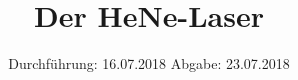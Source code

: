 
\usepackage{nicefrac}

\subject{V61}
\title{Der HeNe-Laser}
\date{
\centering
  Durchführung: 16.07.2018
  \hspace{3em}
  Abgabe: 23.07.2018
}



\maketitle
\thispagestyle{empty}
\tableofcontents
\newpage

%

%




\printbibliography


